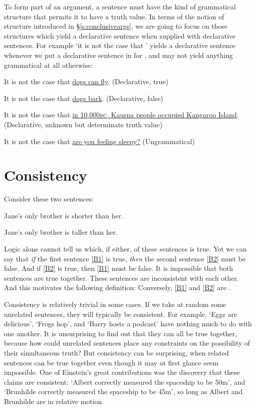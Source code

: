 To form part of an argument, a sentence must have the kind of grammatical structure that permits it to have a truth value. In terms of the notion of structure introduced in §\ref{s:conclusiveargs}, we are going to focus on those structures which yield a declarative sentence when supplied with declarative sentences. For example `it is not the case that ' yields a declarative sentence whenever we put a declarative sentence in for , and may not yield anything grammatical at all otherwise: \begin{earg}
	\item[\ex{decl1}] It is not the case that \underline{dogs can fly}. (Declarative, true)
	\item[\ex{decl2}] It is not the case that \underline{dogs bark}. (Declarative, false)
	\item[\ex{decl3}] It is not the case that \underline{in 10,000\textsc{bc}, Kaurna people occupied Kangaroo Island}. (Declarative, unknown but determinate truth value)
	\item[\ex{decl4}] It is not the case that \underline{are you feeling sleepy?} (Ungrammatical)
\end{earg}


\section{Consistency}
Consider these two sentences:
	\begin{earg}
		\item[\ex{B1}] Jane's only brother is shorter than her.
		\item[\ex{B2}] Jane's only brother is taller than her.
	\end{earg}
Logic alone cannot tell us which, if either, of these sentences is true. Yet we can say that \emph{if} the first sentence \ref{B1} is true, \emph{then} the second sentence \ref{B2} must be false. And if \ref{B2} is true, then \ref{B1} must be false. It is impossible that both sentences are true together. These sentences are inconsistent with each other. And this motivates the following definition:
Conversely, \ref{B1} and \ref{B2} are .

Consistency is relatively trivial in some cases. If we take at random some unrelated sentences, they will typically be consistent. For example, ‘Eggs are delicious’, ‘Frogs hop’, and ‘Barry hosts a podcast’ have nothing much to do with one another. It is unsurprising to find out that they can all be true together, because how could unrelated sentences place any constraints on the possibility of their simultaneous truth? But consistency can be surprising, when related sentences can be true together even though it may at first glance seem impossible. One of Einstein's great contributions was the discovery  that these claims are consistent: ‘Albert correctly measured the spaceship to be 50m’, and ‘Brunhilde correctly measured the spaceship to be 45m’, so long as Albert and Brunhilde are in relative motion.

